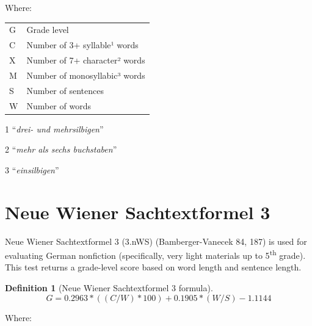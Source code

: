 \documentclass[
]{book}
\theoremstyle{definition}
\newtheorem{definition}{Definition}[chapter]
\theoremstyle{definition}
\theoremstyle{definition}
\theoremstyle{definition}
\theoremstyle{remark}
\begin{document}
Where:

\begin{table}
\centering
\begin{threeparttable}
\begin{tabular}[t]{ll}
\toprule
G & Grade level\\
C & Number of 3+ syllable¹ words\\
X & Number of 7+ character² words\\
M & Number of monosyllabic³ words\\
S & Number of sentences\\
W & Number of words\\
\bottomrule
\end{tabular}
\begin{tablenotes}
\item[1] “\textit{drei- und mehrsilbigen}”
\item[2] “\textit{mehr als sechs buchstaben}”
\item[3] “\textit{einsilbigen}”
\end{tablenotes}
\end{threeparttable}
\end{table}

\newpage

\hypertarget{neue-wiener-sachtextformel3}{%
\section{\texorpdfstring{Neue Wiener Sachtextformel 3}{Neue Wiener Sachtextformel 3}}\label{neue-wiener-sachtextformel3}}

Neue Wiener Sachtextformel 3 (3.nWS) (Bamberger-Vanecek 84, 187) is used for evaluating German nonfiction (specifically, very light materials up to 5\textsuperscript{th} grade). This test returns a grade-level score based on word length and sentence length.

\begin{definition}[Neue Wiener Sachtextformel 3 formula]
\protect\hypertarget{def:nws3}{}{\label{def:nws3} {} }\[
G = 0.2963*((C/W)*100) + 0.1905*(W/S) - 1.1144
\]
\end{definition}

Where:
\end{document}
